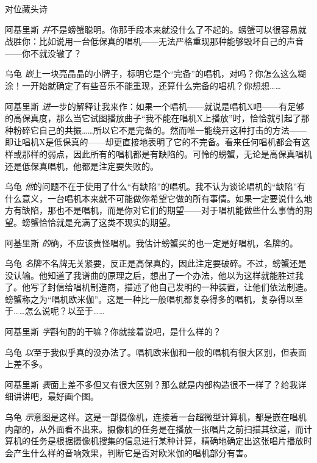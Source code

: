 \begin{dialog}{对位藏头诗}
\begin{dialogue}
\item[阿基里斯]\emph{并}不是螃蟹聪明。你那手段本来就没什么了不起的。螃蟹可以很容易就战胜你：比如说用一台低保真的唱机——无法严格重现那种能够毁坏自己的声音——你不就没辙了？

\item[乌龟]\emph{嵌}上一块亮晶晶的小牌子，标明它是个“完备”的唱机，对吗？你怎么这么糊涂！一开始就确定了有些音乐不能重现，还算什么完备的唱机？你想想……

\item[阿基里斯]\emph{进}一步的解释让我来作：如果一个唱机——就说是唱机X吧——有足够的高保真度，那么当它试图播放曲子“我不能在唱机X上播放”时，恰恰就引起了那种粉碎它自己的共振……所以它不是完备的。然而唯一能绕开这种打击的方法——即让唱机X是低保真的——却更直接地表明了它的不完备。看来任何唱机都会有这样或那样的弱点，因此所有的唱机都是有缺陷的。可怜的螃蟹，无论是高保真唱机还是低保真唱机，他都是注定要失败的。

\item[乌龟]\emph{他}的问题不在于使用了什么“有缺陷”的唱机。我不认为谈论唱机的“缺陷”有什么意义，一台唱机本来就不可能做你希望它做的所有事情。如果一定要说什么地方有缺陷，那也不是唱机，而是你对它们的期望——对于唱机能做些什么事情的期望。螃蟹恰恰就是充满了这类不现实的期望。

\item[阿基里斯]\emph{的}确，不应该责怪唱机。我估计螃蟹买的也一定是好唱机，名牌的。

\item[乌龟]\emph{名}牌不名牌无关紧要，反正是高保真的，因此注定要破碎。不过，螃蟹还是没认输。他知道了我谱曲的原理之后，想出了一个办法，他以为这样就能胜过我了。他写了封信给唱机制造商，描述了他自己发明的一种装置，让他们依法制造。螃蟹称之为“唱机欧米伽”。这是一种比一般唱机都复杂得多的唱机，复杂得以至于……怎么说呢？以至于……

\item[阿基里斯]\emph{字}斟句酌的干嘛？你就接着说吧，是什么样的？

\item[乌龟]\emph{以}至于我似乎真的没办法了。唱机欧米伽和一般的唱机有很大区别，但表面上差不多。

\item[阿基里斯]\emph{表}面上差不多但又有很大区别？那么就是内部构造很不一样了？给我详细讲讲吧，最好画个图。

\item[乌龟]\emph{示}意图是这样。这是一部摄像机，连接着一台超微型计算机，都是嵌在唱机内部的，从外面看不出来。摄像机的任务是在播放一张唱片之前扫描其纹道，而计算机的任务是根据摄像机搜集的信息进行某种计算，精确地确定出这张唱片播放时会产生什么样的音响效果，判断它是否对欧米伽的唱机部分有害。


\end{dialogue}
\end{dialog}
